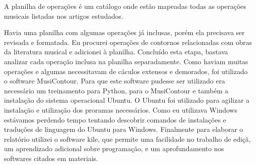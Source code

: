 \documentclass[11pt]{article}
\begin{document}
A planilha de operações é um catálogo onde estão mapeadas todas as
operações musicais listadas nos artigos estudados.

Havia uma planilha com algumas operações já inclusas, porém ela
precisava ser revisada e formatada.
Eu procurei operações de contornos relacionadas com obras da literatura
musical e adicionei à planilha. Concluído esta etapa, bastava
analizar cada operação inclusa na planilha separadamente. Como haviam
muitas operações e algumas necessitavam de cáculos extensos e
demorados, foi utilizado o software MusiContour. Para que este
software pudesse ser utilizado era necessário um treinamento para
Python, para o MusiContour e também a instalação do sistema
operacional Ubuntu. O Ubuntu foi utilizado para agilizar a instalação
e utilização dos proramas necessários. Como eu utilizava Windows
estávamos perdendo tempo tentando descobrir comandos de instalações e
traduções de linguagem do Ubuntu para Windows. Finalmente para
elaborar o relatório utilizei o software kile, que permite uma
facilidade no trabalho de ediçã, um aprendizado adicional sobre
programação, e um aprofundamento nos softwares citados em materiais.

\label{sec:resultados}


\end{document}
